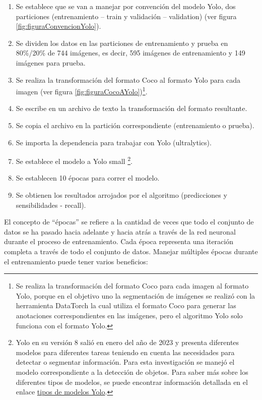 \begin{enumerate}
    \item Se establece que se van a manejar por convención del modelo Yolo, dos particiones (entrenamiento – train y validación – validation) (ver figura \ref{fig:figuraConvencionYolo}).
    \item Se dividen los datos en las particiones de entrenamiento y prueba en 80\%/20\% de 744 imágenes, es decir, 595 imágenes de entrenamiento y 149 imágenes para prueba.
    \item Se realiza la transformación del formato Coco al formato Yolo para cada imagen  (ver figura \ref{fig:figuraCocoAYolo})\footnote{Se realiza la transformación del formato Coco para cada imagen al formato Yolo, porque en el objetivo uno la segmentación de imágenes se realizó con la herramienta DataTorch la cual utiliza el formato Coco para generar las anotaciones correspondientes en las imágenes, pero el algoritmo Yolo solo funciona con el formato Yolo.}.
    \item Se escribe en un archivo de texto la transformación del formato resultante.
    \item Se copia el archivo en la partición correspondiente (entrenamiento o prueba).
    \item Se importa la dependencia para trabajar con Yolo (ultralytics).
    \item Se establece el modelo a Yolo small \footnote{Yolo en su versión 8 salió en enero del año de 2023 y presenta diferentes modelos para diferentes tareas teniendo en cuenta las necesidades para detectar o segmentar información. Para esta investigación se manejó el modelo correspondiente a la detección de objetos. Para saber más sobre los diferentes tipos de modelos, se puede encontrar información detallada en el enlace \href{https://docs.ultralytics.com/es/models/yolov8/\#tareas-y-modos-compatibles}{tipos de modelos Yolo}. }. 
    \item Se establecen 10 épocas para correr el modelo.
    \item Se obtienen los resultados arrojados por el algoritmo (predicciones y sensibilidades - recall).
\end{enumerate}

El concepto de ``épocas'' se refiere a la cantidad de veces que todo el conjunto de datos se ha pasado hacia adelante y hacia atrás a través de la red neuronal durante el proceso de entrenamiento. Cada época representa una iteración completa a través de todo el conjunto de datos.
Manejar múltiples épocas durante el entrenamiento puede tener varios beneficios:

